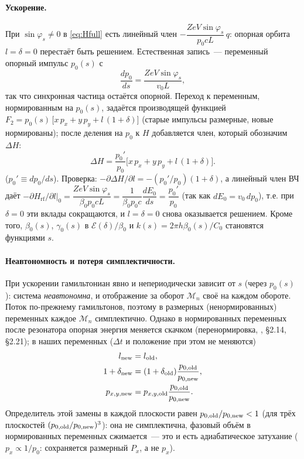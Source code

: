 \documentclass[a4paper,11pt]{article}
\numberwithin{equation}{section}
\newcommand{\rf}{\mathrm{rf}}
\newcommand{\cE}{\mathcal{E}}
\begin{document}
\paragraph{Ускорение.} При $\sin\varphi_s\neq0$ в \eqref{eq:Hfull} есть линейный член
$-\dfrac{ZeV\sin\varphi_s}{p_0cL}\,q$: опорная орбита $l=\delta=0$ перестаёт быть решением. Естественная запись~---
переменный опорный импульс $p_0(s)$ с
\begin{equation}
\frac{dp_0}{ds}=\frac{ZeV\sin\varphi_s}{v_0L},
\end{equation}
так что синхронная частица остаётся опорной. Переход к переменным, нормированным на $p_0(s)$, задаётся
производящей функцией $F_2=p_0(s)\,\big[x\,p_x+y\,p_y+l\,(1+\delta)\big]$ (старые импульсы размерные, новые
нормированы); после деления на $p_0$ к $H$ добавляется член, который обозначим $\Delta H$:
\begin{equation}
\Delta H=\frac{p_0'}{p_0}\Big[x\,p_x+y\,p_y+l\,(1+\delta)\Big]. \label{eq:dH}
\end{equation}
($p_0'\equiv dp_0/ds$).
Проверка: $-\partial\Delta H/\partial l=-(p_0'/p_0)(1+\delta)$, а линейный член ВЧ даёт
$-\partial H_\rf/\partial l\big|_0=\dfrac{ZeV\sin\varphi_s}{\beta_0p_0cL}=\dfrac{1}{\beta_0p_0c}\dfrac{dE_0}{ds}=\dfrac{p_0'}{p_0}$
(так как $dE_0=v_0\,dp_0$), т.е. при $\delta=0$ эти вклады сокращаются, и $l=\delta=0$ снова оказывается решением. Кроме того,
$\beta_0(s)$, $\gamma_0(s)$ в $\cE(\delta)/\beta_0$ и $k(s)=2\pi h\beta_0(s)/C_0$ становятся функциями $s$.

\paragraph{Неавтономность и потеря симплектичности.} При ускорении гамильтониан явно и непериодически зависит от
$s$ (через $p_0(s)$): система \emph{неавтономна}, и отображение за оборот $\mathcal M_n$ своё на каждом обороте.
Поток по-прежнему гамильтонов, поэтому в размерных (ненормированных) переменных каждое $\mathcal M_n$
симплектично. Однако в нормированных переменных после резонатора опорная энергия меняется скачком (перенормировка,
\cite{xsuite}, \S2.14, \S2.21); в наших переменных ($\Delta t$ и положение при этом не меняются)
\begin{equation}
\begin{aligned}
l_{\rm new}&=l_{\rm old},\\
1+\delta_{\rm new}&=(1+\delta_{\rm old})\frac{p_{0,\rm old}}{p_{0,\rm new}},\\
p_{x,y,\rm new}&=p_{x,y,\rm old}\frac{p_{0,\rm old}}{p_{0,\rm new}} .
\end{aligned}
\end{equation}
Определитель этой замены в каждой плоскости равен $p_{0,\rm old}/p_{0,\rm new}<1$ (для трёх плоскостей
$(p_{0,\rm old}/p_{0,\rm new})^3$): она не симплектична, фазовый объём в нормированных переменных сжимается~---
это и есть адиабатическое затухание ($p_x\propto1/p_0$: сохраняется размерный $P_x$, а не $p_x$).
\end{document}

